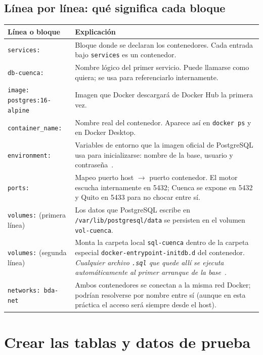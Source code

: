 \documentclass[11pt,a4paper]{article}
\begin{document}
\subsection{L\'inea por l\'inea: qu\'e significa cada bloque}

\begin{xltabular}{\textwidth}{@{}p{5.2cm}X@{}}
\toprule
\textbf{L\'inea o bloque} & \textbf{Explicaci\'on} \\
\midrule
\texttt{services:}                 & Bloque donde se declaran los contenedores. Cada entrada bajo \texttt{services} es un contenedor. \\
\texttt{db-cuenca:}                & Nombre l\'ogico del primer servicio. Puede llamarse como quiera; se usa para referenciarlo internamente. \\
\texttt{image: postgres:16-alpine} & Imagen que Docker descargar\'a de Docker Hub la primera vez. \\
\texttt{container\_name:}          & Nombre real del contenedor. Aparece as\'i en \texttt{docker ps} y en Docker Desktop. \\
\texttt{environment:}              & Variables de entorno que la imagen oficial de PostgreSQL usa para inicializarse: nombre de la base, usuario y contrase\~na~\cite{PostgreSQL16Docs}. \\
\texttt{ports:}                    & Mapeo puerto host $\rightarrow$ puerto contenedor. El motor escucha internamente en 5432; Cuenca se expone en 5432 y Quito en 5433 para no chocar entre s\'i. \\
\texttt{volumes:} (primera l\'inea) & Los datos que PostgreSQL escribe en \texttt{/var/lib/postgresql/data} se persisten en el volumen \texttt{vol-cuenca}. \\
\texttt{volumes:} (segunda l\'inea) & Monta la carpeta local \texttt{sql-cuenca} dentro de la carpeta especial \texttt{docker-entrypoint-initdb.d} del contenedor. \emph{Cualquier archivo \texttt{.sql} que quede all\'i se ejecuta autom\'aticamente al primer arranque de la base}~\cite{PostgreSQL16Docs}. \\
\texttt{networks: bda-net}         & Ambos contenedores se conectan a la misma red Docker; podr\'ian resolverse por nombre entre s\'i (aunque en esta pr\'actica el acceso ser\'a siempre desde el host). \\
\bottomrule
\end{xltabular}

\clearpage
\section{Crear las tablas y datos de prueba}
\end{document}
